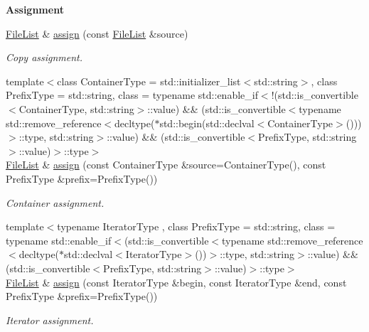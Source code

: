 \begin{Indent}{\bf Assignment}\par
\begin{DoxyCompactItemize}
\item 
\hyperlink{exceptionmagrathea_1_1FileList}{File\-List} \& \hyperlink{exceptionmagrathea_1_1FileList_a5c620a1ac6dd06d07d49ff6a8c5483e1}{assign} (const \hyperlink{exceptionmagrathea_1_1FileList}{File\-List} \&source)
\begin{DoxyCompactList}\small\item\em Copy assignment. \end{DoxyCompactList}\item 
{\footnotesize template$<$class Container\-Type  = std\-::initializer\-\_\-list$<$std\-::string$>$, class Prefix\-Type  = std\-::string, class  = typename std\-::enable\-\_\-if$<$!(std\-::is\-\_\-convertible$<$\-Container\-Type, std\-::string$>$\-::value) \&\& (std\-::is\-\_\-convertible$<$typename std\-::remove\-\_\-reference$<$decltype($\ast$std\-::begin(std\-::declval$<$\-Container\-Type$>$()))$>$\-::type, std\-::string$>$\-::value) \&\& (std\-::is\-\_\-convertible$<$\-Prefix\-Type, std\-::string$>$\-::value)$>$\-::type$>$ }\\\hyperlink{exceptionmagrathea_1_1FileList}{File\-List} \& \hyperlink{exceptionmagrathea_1_1FileList_a5d40cefba8be8de976a0451ef5fcde2f}{assign} (const Container\-Type \&source=Container\-Type(), const Prefix\-Type \&prefix=Prefix\-Type())
\begin{DoxyCompactList}\small\item\em Container assignment. \end{DoxyCompactList}\item 
{\footnotesize template$<$typename Iterator\-Type , class Prefix\-Type  = std\-::string, class  = typename std\-::enable\-\_\-if$<$(std\-::is\-\_\-convertible$<$typename std\-::remove\-\_\-reference$<$decltype($\ast$std\-::declval$<$\-Iterator\-Type$>$())$>$\-::type, std\-::string$>$\-::value) \&\& (std\-::is\-\_\-convertible$<$\-Prefix\-Type, std\-::string$>$\-::value)$>$\-::type$>$ }\\\hyperlink{exceptionmagrathea_1_1FileList}{File\-List} \& \hyperlink{exceptionmagrathea_1_1FileList_a1072fa43580701fd40f88f244114cad6}{assign} (const Iterator\-Type \&begin, const Iterator\-Type \&end, const Prefix\-Type \&prefix=Prefix\-Type())
\begin{DoxyCompactList}\small\item\em Iterator assignment. \end{DoxyCompactList}\item 

\end{DoxyCompactItemize}
\end{Indent}
